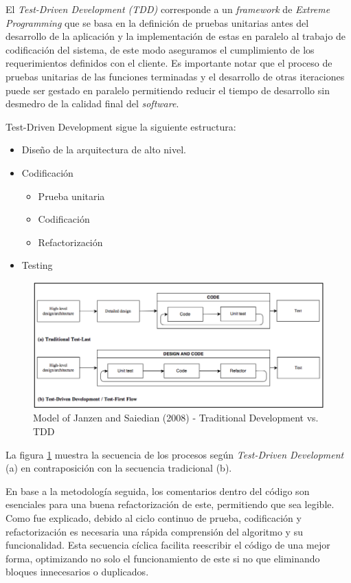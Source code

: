 El \textit{Test-Driven Development (TDD)} corresponde a un \textit{framework} de \textit{Extreme Programming} que se basa en la definición de pruebas unitarias antes del desarrollo de la aplicación y la implementación de estas en paralelo al trabajo de codificación del sistema, de este modo aseguramos el cumplimiento de los requerimientos definidos con el cliente. Es importante notar que el proceso de pruebas unitarias de las funciones terminadas y el desarrollo de otras iteraciones puede ser gestado en paralelo permitiendo reducir el tiempo de desarrollo sin desmedro de la calidad final del \textit{software}. 

Test-Driven Development sigue la siguiente estructura:
\begin{itemize}
	\item Diseño de la arquitectura de alto nivel.
	\item Codificación
		\begin{itemize}
		\item Prueba unitaria
		\item Codificación
		\item Refactorización
		\end{itemize}
	\item Testing
\end{itemize}

\begin{figure}[ht!]
\centering
\includegraphics[width=1\textwidth]{figures/mapa-tdd.png}
\caption{Model of Janzen and Saiedian (2008) - Traditional Development vs. TDD}
\label{fig:Traditional Development vs. TDD}
\end{figure}

La figura \ref{fig:Traditional Development vs. TDD} muestra la secuencia de los procesos según \textit{Test-Driven Development} (a) en contraposición con la secuencia tradicional (b).

En base a la metodología seguida, los comentarios dentro del código son esenciales para una buena refactorización de este, permitiendo que sea legible. Como fue explicado, debido al ciclo continuo de prueba, codificación y refactorización es necesaria una rápida comprensión del algoritmo y su funcionalidad. Esta secuencia cíclica facilita reescribir el código de una mejor forma, optimizando no solo el funcionamiento de este si no que eliminando bloques innecesarios o duplicados.

